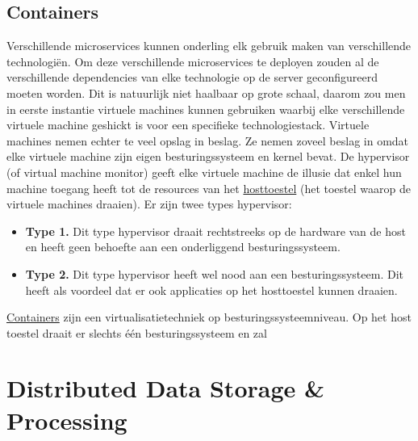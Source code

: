 \documentclass{report}
\begin{document}
	\chapter{Containers}
	Verschillende microservices kunnen onderling elk gebruik maken van verschillende technologiën. Om deze verschillende microservices te deployen zouden al de verschillende dependencies van elke technologie op de server geconfigureerd moeten worden. Dit is natuurlijk niet haalbaar op grote schaal, daarom zou men in eerste instantie virtuele machines kunnen gebruiken waarbij elke verschillende virtuele machine geshickt is voor een specifieke technologiestack. Virtuele machines nemen echter te veel opslag in beslag. Ze nemen zoveel beslag in omdat elke virtuele machine zijn eigen besturingssysteem en kernel bevat. De hypervisor (of virtual machine monitor) geeft elke virtuele machine de illusie dat enkel hun machine toegang heeft tot de resources van het \underline{hosttoestel} (het toestel waarop de virtuele machines draaien). 
	Er zijn twee types hypervisor:
	\begin{itemize}
		\item \textbf{Type 1.} Dit type hypervisor draait rechtstreeks op de hardware van de host en heeft geen behoefte aan een onderliggend besturingssysteem. 
		\item \textbf{Type 2.} Dit type hypervisor heeft wel nood aan een besturingssysteem. Dit heeft als voordeel dat er ook applicaties op het hosttoestel kunnen draaien.
	\end{itemize}
	\underline{Containers} zijn een virtualisatietechniek op besturingssysteemniveau. Op het host toestel draait er slechts één besturingssysteem en zal 
 
	\part{Distributed Data Storage \& Processing}
\end{document}
